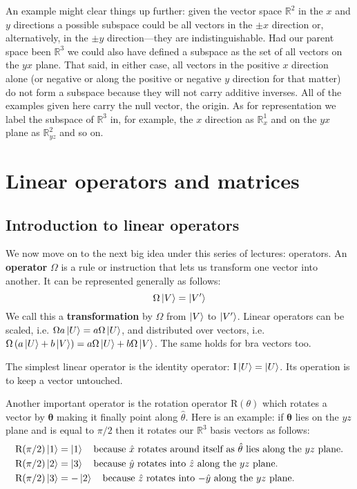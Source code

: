 \documentclass[english,seminar,headertitle]{lecture}
\begin{document}
An example might clear things up further: given the vector space $\mathbb{R}^2$ in the $x$ and $y$ directions a possible subspace could be all vectors in the $\pm x$ direction or, alternatively, in the $\pm y$ direction---they are indistinguishable. Had our parent space been $\mathbb{R}^3$ we could also have defined a subspace as the set of all vectors on the $yx$ plane. That said, in either case, all vectors in the positive $x$ direction alone (or negative or along the positive or negative $y$ direction for that matter) do not form a subspace because they will not carry additive inverses. All of the examples given here carry the null vector, the origin. As for representation we label the subspace of $\mathbb{R}^3$ in, for example, the $x$ direction as $\mathbb{R}^1_x$ and on the $yx$ plane as $\mathbb{R}^2_{yz}$ and so on.

\section{Linear operators and matrices}
\subsection{Introduction to linear operators}

We now move on to the next big idea under this series of lectures: operators. An \textbf{operator} $\Omega$ is a rule or instruction that lets us transform one vector into another. It can be represented generally as follows:
\[
	\Omega \ket{V} = \ket{V'}
\]
We call this a \textbf{transformation} by $\Omega$ from $\ket{V}$ to $\ket{V'}$. Linear operators can be scaled, i.e. $\Omega a\ket{U} = a\Omega\ket{U}$, and distributed over vectors, i.e. $\Omega \left(a\ket{U} + b\ket{V}\right) = a\Omega\ket{U} + b\Omega\ket{V}$. The same holds for bra vectors too.

The simplest linear operator is the identity operator: $\textrm{I}\ket{U} = \ket{U}$. Its operation is to keep a vector untouched.

Another important operator is the rotation operator $\textrm{R}(\theta)$ which rotates a vector by $\boldsymbol{\theta}$ making it finally point along $\hat{\theta}$. Here is an example: if $\boldsymbol{\theta}$ lies on the $yz$ plane and is equal to $\pi/2$ then it rotates our $\mathbb{R}^3$ basis vectors as follows:
\begin{align*}
	\textrm{R}(\pi/2)\ket{1} &= \ket{1} \quad\textrm{because $\hat{x}$ rotates around itself as $\hat{\theta}$ lies along the $yz$ plane.} \\
	\textrm{R}(\pi/2)\ket{2} &= \ket{3} \quad\textrm{because $\hat{y}$ rotates into $\hat{z}$ along the $yz$ plane.} \\
	\textrm{R}(\pi/2)\ket{3} &= -\ket{2} \quad\textrm{because $\hat{z}$ rotates into $-\hat{y}$ along the $yz$ plane.}
\end{align*}
\end{document}
